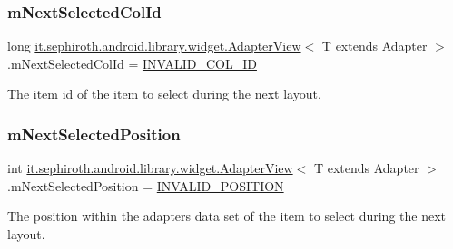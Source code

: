 \subsubsection{\texorpdfstring{m\+Next\+Selected\+Col\+Id}{mNextSelectedColId}}
{\footnotesize\ttfamily long \hyperlink{classit_1_1sephiroth_1_1android_1_1library_1_1widget_1_1_adapter_view}{it.\+sephiroth.\+android.\+library.\+widget.\+Adapter\+View}$<$ T extends Adapter $>$.m\+Next\+Selected\+Col\+Id = \hyperlink{classit_1_1sephiroth_1_1android_1_1library_1_1widget_1_1_adapter_view_a4652ef84c3de9de7d3697a29e2bb96c6}{I\+N\+V\+A\+L\+I\+D\+\_\+\+C\+O\+L\+\_\+\+ID}\hspace{0.3cm}{\ttfamily [protected]}}

The item id of the item to select during the next layout. \mbox{\label{classit_1_1sephiroth_1_1android_1_1library_1_1widget_1_1_adapter_view_ab7b813f8435453a67af32da2dd84fe36}} 
\subsubsection{\texorpdfstring{m\+Next\+Selected\+Position}{mNextSelectedPosition}}
{\footnotesize\ttfamily int \hyperlink{classit_1_1sephiroth_1_1android_1_1library_1_1widget_1_1_adapter_view}{it.\+sephiroth.\+android.\+library.\+widget.\+Adapter\+View}$<$ T extends Adapter $>$.m\+Next\+Selected\+Position = \hyperlink{classit_1_1sephiroth_1_1android_1_1library_1_1widget_1_1_adapter_view_a2751b7d592638baeaf149f6da0d4e598}{I\+N\+V\+A\+L\+I\+D\+\_\+\+P\+O\+S\+I\+T\+I\+ON}\hspace{0.3cm}{\ttfamily [protected]}}

The position within the adapter\textquotesingle{}s data set of the item to select during the next layout. \mbox{\label{classit_1_1sephiroth_1_1android_1_1library_1_1widget_1_1_adapter_view_a46fc9b842085b37342496116ae383497}} 
